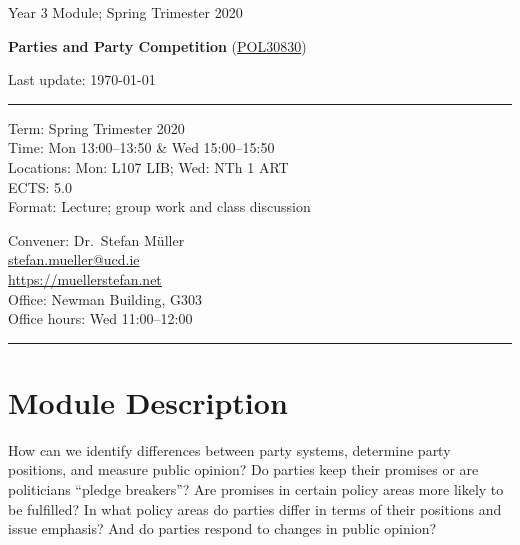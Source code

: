 \documentclass[abstract=on,parskip=full,headings=standardclasses,fontsize=11pt,paper=a4]{scrartcl}
\begin{document}
\singlespacing
\vspace{1cm}

\begin{center}
{\large Year 3 Module; 
Spring Trimester 2020} \\ 
\bigskip

{\Large \textbf{Parties and Party Competition} (\href{https://sisweb.ucd.ie/usis/!W_HU_MENU.P_PUBLISH?p_tag=MODULE&MODULE=POL30830}{POL30830})} 
\bigskip


{\large  {Last update: \today}}\\
\bigskip

\end{center}

\vspace{1.5cm}



\hrule
\medskip
\begin{minipage}[t]{0.5\textwidth}
Term: Spring Trimester 2020 \\
Time: Mon 13:00--13:50 \& Wed 15:00--15:50 \\
Locations:  Mon: L107 LIB; Wed: NTh 1 ART  \\
ECTS: 5.0 \\
Format: Lecture; group work and class discussion
\end{minipage}
\begin{minipage}[t]{0.49\textwidth}
\begin{flushright}
Convener: Dr.\ Stefan Müller \\
 \href{mailto:stefan.mueller@ucd.ie}{\textsf{stefan.mueller@ucd.ie}} \\
 \url{https://muellerstefan.net} \\
Office:  Newman Building, G303 \\
Office hours: Wed 11:00--12:00
\end{flushright}
\end{minipage}
\medskip
\hrule 

\section*{Module Description}

How can we  identify differences between party systems, determine party positions, and measure public opinion?  
Do parties keep their promises or are politicians ``pledge breakers''? Are promises in certain policy areas more likely to be fulfilled? In what policy areas do parties differ in terms of their positions and issue emphasis? And do parties respond to changes in public opinion?  
\end{document}
